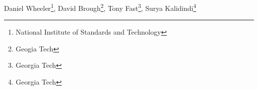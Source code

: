 Daniel Wheeler\footnote{National Institute of Standards and Technology},
David Brough\footnote{Geogia Tech},
Tony Fast\footnote{Georgia Tech},
Surya Kalidindi\footnote{Georgia Tech}